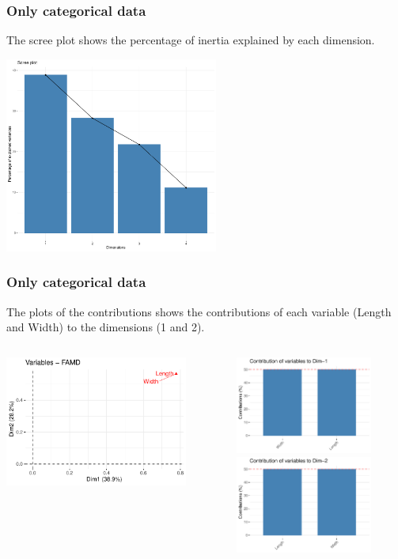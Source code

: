 \begin{frame}
\frametitle{Only categorical data}
The scree plot shows the percentage of inertia explained by each dimension.
\begin{center}
\includegraphics[width=7cm]{../../Graphs/FAMD_screeplot.pdf}
\end{center}
\end{frame}
\begin{frame}
\frametitle{Only categorical data}
\small
The plots of the contributions shows the contributions of each variable (Length and Width) to the dimensions (1 and 2).
\normalsize
\begin{columns}
\begin{column}{0.55\textwidth}
\includegraphics[width=6cm]{../../Graphs/FAMD_contrib_xy.pdf}
\end{column}
\begin{column}{0.45\textwidth}
\includegraphics[width=4.5cm]{../../Graphs/FAMD_contrib_x.pdf}\\
\includegraphics[width=4.5cm]{../../Graphs/FAMD_contrib_y.pdf}
\end{column}
\end{columns}
\end{frame}
